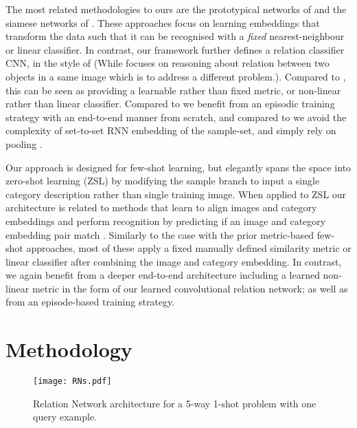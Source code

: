 \documentclass[10pt,twocolumn,letterpaper]{article}
\begin{document}
The most related methodologies to ours are the prototypical networks of \cite{snell2017prototypical} and the siamese networks of \cite{koch2015siamese}. These approaches focus on learning embeddings that transform the data such that it can be recognised with a \emph{fixed} nearest-neighbour \cite{snell2017prototypical} or linear \cite{koch2015siamese,snell2017prototypical} classifier. In contrast, our framework further defines a relation classifier CNN, in the style of \cite{santoro2017simple, zagoruyko2015learning, han2015matchnet} (While \cite{santoro2017simple} focuses on reasoning about relation between two objects in a same image which is to address a different problem.). Compared to \cite{koch2015siamese,snell2017prototypical}, this can be seen as providing a learnable rather than fixed metric, or non-linear rather than linear classifier. Compared to \cite{koch2015siamese} we benefit from an episodic training strategy  with an end-to-end manner from scratch, and compared to \cite{santoro2016meta} we avoid the complexity of set-to-set RNN embedding of the sample-set, and simply rely on pooling \cite{santoro2017simple}.



 Our approach is designed for few-shot learning, but elegantly spans the space into zero-shot learning (ZSL) by modifying the sample branch to input a single category description rather than single training image. When applied to ZSL our architecture is related to methods that learn to align images and category embeddings and perform recognition by predicting if an image and category embedding pair match \cite{frome2013devise,akata2015evaluation,yang2014unified,zhang2015zero}. Similarly to the case with the prior metric-based few-shot approaches, most of these apply a fixed manually defined similarity metric or linear classifier after combining the image and category embedding. In contrast, we again benefit from a deeper end-to-end architecture including a learned non-linear metric in the form of our learned convolutional relation network; as well as from an episode-based training strategy.

\section{Methodology}

\begin{figure*}
\begin{center}

\texttt{[image: RNs.pdf]}
\end{center}
\caption{\small Relation Network architecture for a 5-way 1-shot problem with one query example.}
\label{fig:schematic}
\vspace{-1em}
\end{figure*}
\end{document}
